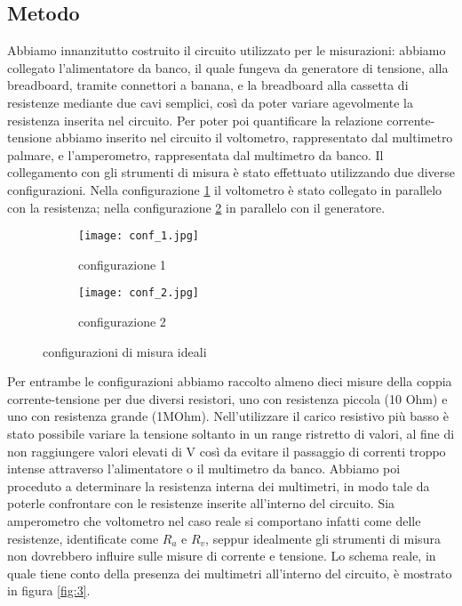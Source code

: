 \documentclass[a4paper]{article}
\begin{document}
\subsection{Metodo}
Abbiamo innanzitutto costruito il circuito utilizzato per le misurazioni: abbiamo collegato l'alimentatore da banco, il quale fungeva da generatore di tensione, alla breadboard, tramite connettori a banana,
e la breadboard alla cassetta di resistenze mediante due cavi semplici, così da poter variare agevolmente la resistenza inserita nel circuito.
Per poter poi quantificare la relazione corrente-tensione abbiamo inserito nel circuito il voltometro, rappresentato dal multimetro palmare, e l'amperometro, rappresentata dal multimetro da banco.
Il collegamento con gli strumenti di misura è stato effettuato utilizzando due diverse configurazioni. Nella configurazione \ref{fig:1} il voltometro è stato collegato in parallelo con la resistenza;
nella configurazione \ref{fig:2} in parallelo con il generatore.
\begin{figure}[htbp]
	\centering
	\begin{subfigure}[b]{0.45\textwidth}
		\texttt{[image: conf\_1.jpg]}
		\caption{configurazione 1}
		\label{fig:1}
	\end{subfigure}
	\hfill
	\begin{subfigure}[b]{0.45\textwidth}
		\texttt{[image: conf\_2.jpg]}
		\caption{configurazione 2}
		\label{fig:2}
	\end{subfigure}
	\caption{configurazioni di misura ideali}
	\label{fig:prima}
\end{figure}
Per entrambe le configurazioni abbiamo raccolto almeno dieci misure della coppia corrente-tensione per due diversi resistori, uno con resistenza piccola (10 Ohm) e uno con resistenza grande (1MOhm).
Nell'utilizzare il carico resistivo più basso è stato possibile variare la tensione soltanto in un range ristretto di valori,
al fine di non raggiungere valori elevati di V così da evitare il passaggio di correnti troppo intense attraverso l'alimentatore o il multimetro da banco.
Abbiamo poi proceduto a determinare la resistenza interna dei multimetri, in modo tale da poterle confrontare con le resistenze inserite all'interno del circuito.
Sia amperometro che voltometro nel caso reale si comportano infatti come delle resistenze, identificate come \( \mathit{R_a} \) e \( \mathit{R_v} \),
seppur idealmente gli strumenti di misura non dovrebbero influire sulle misure di corrente e tensione.
Lo schema reale, in quale tiene conto della presenza dei multimetri all'interno del circuito, è mostrato in figura \ref{fig:3}.
\end{document}

